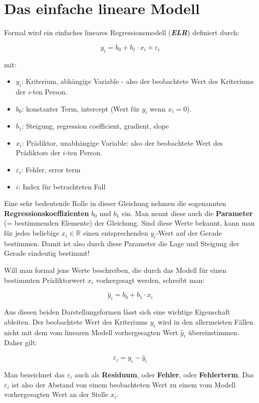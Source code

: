 \documentclass[
]{article}
\providecommand{\tightlist}{%
  \setlength{\itemsep}{0pt}\setlength{\parskip}{0pt}}
\begin{document}
\section*{Das einfache lineare Modell}\label{das-einfache-lineare-modell}

Formal wird ein einfaches lineares Regressionsmodell (\textbf{\emph{ELR}}) definiert durch:

\[y_i = b_0 + b_1 \cdot x_i + \varepsilon_i\]

mit:

\begin{itemize}
\tightlist
\item
  \(y_i\): Kriterium, abhängige Variable - also der beobachtete Wert des Kriteriums der \(i\)-ten Person.
\item
  \(b_0\): konstanter Term, intercept (Wert für \(y_i\) wenn \(x_i = 0\)).
\item
  \(b_1\): Steigung, regression coefficient, gradient, slope
\item
  \(x_i\): Prädiktor, unabhängige Variable: also der beobachtete Wert des Prädiktors der \(i\)-ten Person.
\item
  \(\varepsilon_i\): Fehler, error term
\item
  \(i\): Index für betrachteten Fall
\end{itemize}

Eine sehr bedeutende Rolle in dieser Gleichung nehmen die sogenannten \textbf{Regressionskoeffizienten} \(b_0\) und \(b_1\) ein. Man nennt diese auch die \textbf{Parameter} (= bestimmenden Elemente) der Gleichung. Sind diese Werte bekannt, kann man für jedes beliebige \(x_i \in \mathbb{R}\) einen entsprechenden \(y_i\)-Wert auf der Gerade bestimmen. Damit ist also durch diese Parameter die Lage und Steigung der Gerade eindeutig bestimmt!

Will man formal jene Werte beschreiben, die durch das Modell für einen bestimmten Prädiktorwert \(x_i\) vorhergesagt werden, schreibt man:

\[\hat{y}_i = b_0 + b_1 \cdot x_i\]

Aus diesen beiden Darstellungsformen lässt sich eine wichtige Eigenschaft ableiten. Der beobachtete Wert des Kriteriums \(y_i\) wird in den allermeisten Fällen nicht mit dem vom linearen Modell vorhergesagten Wert \(\hat{y}_i\) übereinstimmen. Daher gilt:

\[\varepsilon_i = y_i - \hat{y}_i\]

Man bezeichnet das \(\varepsilon_i\) auch als \textbf{Residuum}, oder \textbf{Fehler}, oder \textbf{Fehlerterm}. Das \(\varepsilon_i\) ist also der Abstand von einem beobachteten Wert zu einem vom Modell vorhergesagten Wert an der Stelle \(x_i\).
\end{document}
